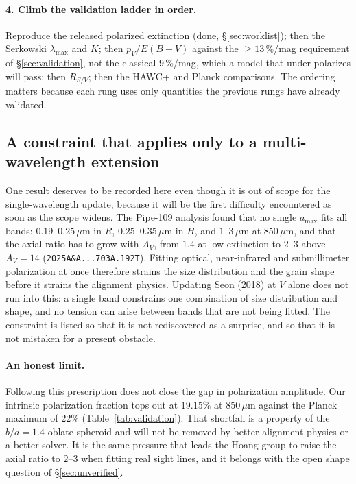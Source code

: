 \documentclass{my_memo}
\newcommand{\code}[1]{\texttt{#1}}
\newcommand{\um}{\ensuremath{\,\mu\mathrm{m}}}
\newcommand{\Av}{\ensuremath{A_V}}
\begin{document}
\paragraph{4. Climb the validation ladder in order.} Reproduce the
released polarized extinction (done, \S\ref{sec:worklist}); then the
Serkowski $\lambda_{\max}$ and $K$; then $p_V/E(B-V)$ against the
$\geq 13\,\%$/mag requirement of \S\ref{sec:validation}, not the
classical $9\,\%$/mag, which a model that under-polarizes will pass;
then $R_{S/V}$; then the HAWC+ and Planck comparisons. The ordering
matters because each rung uses only quantities the previous rungs have
already validated.

\subsection{A constraint that applies only to a multi-wavelength
extension}

One result deserves to be recorded here even though it is out of scope
for the single-wavelength update, because it will be the first
difficulty encountered as soon as the scope widens. The Pipe-109
analysis found that no single $a_{\max}$ fits all bands:
$0.19$--$0.25\um$ in $R$, $0.25$--$0.35\um$ in $H$, and $1$--$3\um$ at
$850\um$, and that the axial ratio has to grow with \Av, from $1.4$ at
low extinction to $2$--$3$ above $\Av = 14$
(\code{2025A\&A...703A.192T}). Fitting optical, near-infrared and
submillimeter polarization at once therefore strains the size
distribution and the grain shape before it strains the alignment
physics. Updating Seon (2018) at $V$ alone does not run into this: a
single band constrains one combination of size distribution and shape,
and no tension can arise between bands that are not being fitted. The
constraint is listed so that it is not rediscovered as a surprise, and
so that it is not mistaken for a present obstacle.

\paragraph{An honest limit.} Following this prescription does not close
the gap in polarization amplitude. Our intrinsic polarization fraction
tops out at $19.15\%$ at $850\um$ against the Planck maximum of $22\%$
(Table~\ref{tab:validation}). That shortfall is a property of the
$b/a = 1.4$ oblate spheroid and will not be removed by better alignment
physics or a better solver. It is the same pressure that leads the Hoang
group to raise the axial ratio to $2$--$3$ when fitting real sight
lines, and it belongs with the open shape question of
\S\ref{sec:unverified}.
\end{document}
